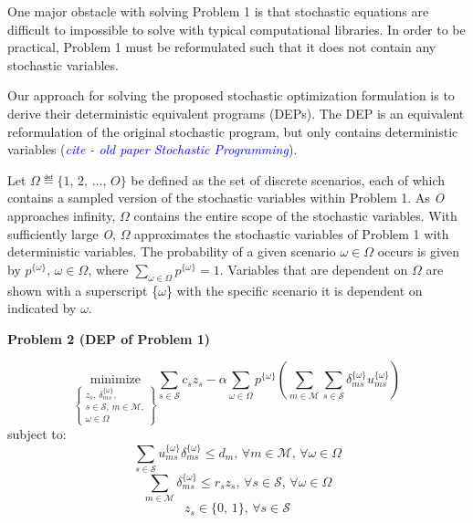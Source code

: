 \documentclass[onecolumn,draftcls]{IEEEtran}
\begin{document}

One major obstacle with solving Problem 1 is that stochastic equations are difficult to impossible to solve with typical computational libraries.  In order to be practical, Problem 1 must be reformulated such that it does not contain any stochastic variables.

Our approach for solving the proposed stochastic optimization formulation is to derive their deterministic equivalent programs (DEPs).  The DEP is an equivalent reformulation of the original stochastic program, but only contains deterministic variables (\textit{\textcolor{blue}{cite - old paper Stochastic Programming}}).

Let $ \Omega \eqdef \{1,\, 2,\, \ldots,\, O\} $ be defined as the set of discrete scenarios, each of which contains a sampled version of the stochastic variables within Problem 1.  As \textit{O} approaches infinity, $\Omega$ contains the entire scope of the stochastic variables.  With sufficiently large \textit{O}, $\Omega$ approximates the stochastic variables of Problem 1 with deterministic variables.  The probability of a given scenario $\omega \in \Omega$ occurs is given by $p^{\{\omega\}},\, \omega \in \Omega$, where $\sum_{\omega \in \Omega} p^{\{\omega\}} = 1$.  Variables that are dependent on $\Omega$ are shown with a superscript \{$\omega$\} with the specific scenario it is dependent on indicated by $\omega$.

\vspace{5mm}
\noindent \textbf{Problem 2 (DEP of Problem 1)}



\begin{equation} \label{eq:P2}
\underset{\left\{ \substack{
	z_s,\, \delta_{ms}^{\{\omega\}},\\
	s \in \mathcal{S},\, m \in \mathcal{M},\\
	\omega \in \Omega} \right\}} {\text{minimize}}
\sum_{s \in \mathcal{S}} c_s z_s - \alpha \sum_{\omega \in \Omega} p^{\{\omega\}} \left( \sum_{m \in \mathcal{M}} \sum_{s \in \mathcal{S}} \delta_{ms}^{\{\omega\}} u_{ms}^{\{\omega\}} \right)
\end{equation}
subject to:
\begin{equation} \label{eq:P2C1}
\sum_{s \in \mathcal{S}} u_{ms}^{\{\omega\}} \delta_{ms}^{\{\omega\}} \leq d_m,\, \forall m \in \mathcal{M},\, \forall \omega \in \Omega
\end{equation}
\begin{equation} \label{eq:P2C2}
\sum_{m \in \mathcal{M}} \delta_{ms}^{\{\omega\}} \leq r_s z_s,\, \forall s \in \mathcal{S},\, \forall \omega \in \Omega
\end{equation}
\begin{equation} \label{eq:P2C3}
z_s \in \{0,\, 1\},\, \forall s \in \mathcal{S}
\end{equation}
\end{document}
